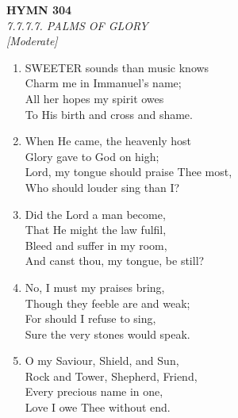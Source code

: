 \newpage
\begin{center}
    {\Large \textbf{HYMN 304}}
    \\
    \textit{7.7.7.7. PALMS OF GLORY}
    \\
    \textit{\small [Moderate]}
\end{center}
\vspace{1em}

\begin{enumerate}
    \item SWEETER sounds than music knows \\
        Charm me in Immanuel's name; \\
        All her hopes my spirit owes \\
        To His birth and cross and shame.

    \item When He came, the heavenly host \\
        Glory gave to God on high; \\
        Lord, my tongue should praise Thee most, \\
        Who should louder sing than I?

    \item Did the Lord a man become, \\
        That He might the law fulfil, \\
        Bleed and suffer in my room, \\
        And canst thou, my tongue, be still?

    \item No, I must my praises bring, \\
        Though they feeble are and weak; \\
        For should I refuse to sing, \\
        Sure the very stones would speak.

    \item O my Saviour, Shield, and Sun, \\
        Rock and Tower, Shepherd, Friend, \\
        Every precious name in one, \\
        Love I owe Thee without end.

\end{enumerate}
